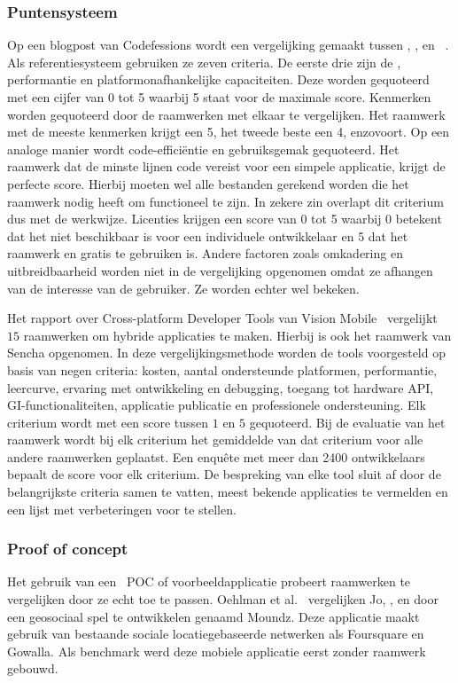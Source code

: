 \subsubsection{Puntensysteem}
\label{sec:manier-puntensysteem}
Op een blogpost van Codefessions wordt een vergelijking gemaakt tussen \jqm{}, \st{}, \jqt{} en \kendo{}~\cite{Sarrafi2012a}.  
Als referentiesysteem gebruiken ze zeven criteria.  
De eerste drie zijn de , performantie en platformonafhankelijke capaciteiten.  
Deze worden gequoteerd met een cijfer van 0 tot 5 waarbij 5 staat voor de maximale score.
Kenmerken worden gequoteerd door de raamwerken met elkaar te vergelijken.  
Het raamwerk met de meeste kenmerken krijgt een 5, het tweede beste een 4, enzovoort. 
Op een analoge manier wordt code-efficiëntie en gebruiksgemak gequoteerd.  
Het raamwerk dat de minste lijnen code vereist voor een simpele applicatie, krijgt de perfecte score. 
Hierbij moeten wel alle bestanden gerekend worden die het raamwerk nodig heeft om functioneel te zijn. 
In zekere zin overlapt dit criterium dus met de  werkwijze.
Licenties krijgen een score van 0 tot 5 waarbij 0 betekent dat het niet beschikbaar is voor een individuele ontwikkelaar en 5 dat het raamwerk  en gratis te gebruiken is. 
Andere factoren zoals omkadering en uitbreidbaarheid worden niet in de vergelijking opgenomen omdat ze afhangen van de interesse van de gebruiker.  
Ze worden echter wel bekeken.


Het rapport over Cross-platform Developer Tools van Vision Mobile~\cite{Mobile2012} vergelijkt $15$ raamwerken om hybride applicaties te maken.
Hierbij is ook het raamwerk van Sencha opgenomen.
In deze vergelijkingsmethode worden de tools voorgesteld op basis van negen criteria:  kosten,  aantal ondersteunde platformen,  performantie,  leercurve,  ervaring met ontwikkeling en debugging,  toegang tot hardware API,  GI-functionaliteiten,  applicatie publicatie en professionele ondersteuning.
Elk criterium wordt met een score tussen $1$ en $5$ gequoteerd.
Bij de evaluatie van het raamwerk wordt bij elk criterium het gemiddelde van dat criterium voor alle andere raamwerken geplaatst.
Een enquête met meer dan 2400 ontwikkelaars bepaalt de score voor elk criterium.
De bespreking van elke tool sluit af door de belangrijkste criteria samen te vatten,  meest bekende applicaties te vermelden en een lijst met verbeteringen voor te stellen.

\subsubsection{Proof of concept}
\label{sec:manier-poc}
Het gebruik van een ~POC of voorbeeldapplicatie probeert raamwerken te vergelijken door ze echt toe te passen.
Oehlman et al.~\cite{Oeflman2011} vergelijken Jo, \jqt{},  \jqm{} en \st{} door een geosociaal spel te ontwikkelen genaamd Moundz. 
Deze applicatie maakt gebruik van bestaande sociale locatiegebaseerde netwerken als Foursquare en Gowalla.
Als benchmark werd deze mobiele applicatie eerst zonder raamwerk gebouwd.

